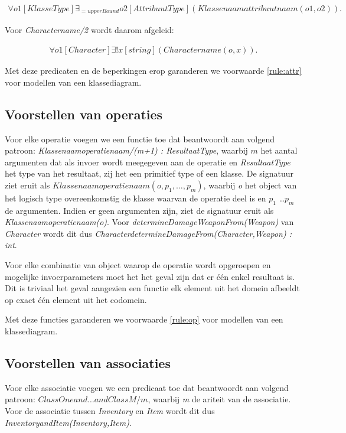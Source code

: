 \begin{align*}
	\forall{o1}[KlasseType] \exists_{=upperBound}{o2}[AttribuutType](Klassenaamattribuutnaam(o1,o2)).
\end{align*}
	
Voor \textit{Charactername/2} wordt daarom afgeleid:
	
\begin{align*}
	\forall{o1}[Character]\exists!{x}[string](Charactername(o,x)).
\end{align*}

Met deze predicaten en de beperkingen erop garanderen we voorwaarde \ref{rule:attr} voor modellen van een klassediagram.

\subsection{Voorstellen van operaties}\label{sec:cons-method}
Voor elke operatie voegen we een functie toe dat beantwoordt aan volgend patroon: \sloppy
	 \textit{Klassenaamoperatienaam/(m+1) : ResultaatType}, waarbij $m$ het aantal argumenten dat als invoer wordt meegegeven aan de operatie en \textit{ResultaatType} het type van het resultaat, zij het een primitief type of een klasse. De signatuur ziet eruit als \textit{$Klassenaamoperatienaam(o,p_1,\ldots,p_m)$}, waarbij \textit{o} het object van het logisch type overeenkomstig de klasse waarvan de operatie deel is en \textit{$p_1$} \ldots \textit{$p_m$} de argumenten. Indien er geen argumenten zijn, ziet de signatuur eruit als \textit{Klassenaamoperatienaam(o)}. Voor \textit{determineDamageWeaponFrom(Weapon)} van \textit{Character} wordt dit dus \textit{CharacterdetermineDamageFrom(Character,Weapon) : int}.

Voor elke combinatie van object waarop de operatie wordt opgeroepen en mogelijke invoerparameters moet het het geval zijn dat er \'e\'en enkel resultaat is. Dit is triviaal het geval aangezien een functie elk element uit het domein afbeeldt op exact \'e\'en element uit het codomein.

Met deze functies garanderen we voorwaarde \ref{rule:op} voor modellen van een klassediagram.

\subsection{Voorstellen van associaties}
Voor elke associatie voegen we een predicaat toe dat beantwoordt aan volgend patroon: \textit{$ClassOneand\ldots{}andClassM/m$}, waarbij \textit{m} de ariteit van de associatie. Voor de associatie tussen \textit{Inventory} en \textit{Item} wordt dit dus \textit{InventoryandItem(Inventory,Item)}.

